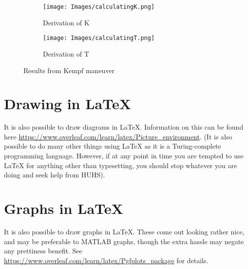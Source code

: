 \begin{figure} [H]
\centering
\begin{subfigure}{.5\textwidth}
  \centering
  \texttt{[image: Images/calculatingK.png]}
  \caption{Derivation of K}
  \label{fig:KempfK}
\end{subfigure}
\begin{subfigure}{.5\textwidth}
  \centering
  \texttt{[image: Images/calculatingT.png]}
  \caption{Derivation of T}
  \label{fig:KempfT}
\end{subfigure}
\caption{Results from Kempf maneuver}
\label{fig:kempf}
\end{figure}

\section{Drawing in \LaTeX{}}

It is also possible to draw diagrams in \LaTeX{}. Information on this can be found here \url{https://www.overleaf.com/learn/latex/Picture_environment}. (It is also possible to do many other things using \LaTeX{} as it is a Turing-complete programming language. However, if at any point in time you are tempted to use \LaTeX{} for anything other than typesetting, you should stop whatever you are doing and seek help from HUHS).

\section{Graphs in \LaTeX{}}

It is also possible to draw graphs in \LaTeX{}. These come out looking rather nice, and may be preferable to MATLAB graphs, though the extra hassle may negate any prettiness benefit. See \url{https://www.overleaf.com/learn/latex/Pgfplots_package} for details.